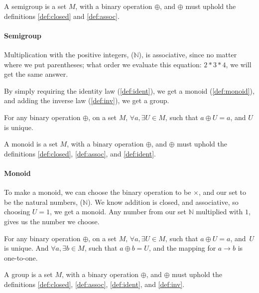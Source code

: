 \begin{definition}[Semigroup] \label{def:semi}
  A semigroup is a set $M$, with a binary operation $\oplus$, and $\oplus$ must
  uphold the definitions \ref{def:closed} and \ref{def:assoc}.
\end{definition}

\paragraph{Semigroup} Multiplication with the positive integers, ($\mathbb{N}$), is
  associative, since no matter where we put parentheses; what order we
  evaluate this equation: $2 * 3 * 4$, we will get the same answer.

By simply requiring the identity law (\ref{def:ident}), we get a
monoid (\ref{def:monoid}), and adding the inverse law
(\ref{def:inv}), we get a group.

\begin{definition} \label{def:ident}
  For any binary operation $\oplus$, on a set $M$,
  $\forall a, \exists U \in M$, such that
  $a \oplus U = a$, and $U$ is unique.
\end{definition}

\begin{definition}[Monoid] \label{def:monoid}
  A monoid is a set $M$, with a binary operation $\oplus$, and $\oplus$ must
  uphold the definitions \ref{def:closed}, \ref{def:assoc}, and \ref{def:ident}.
\end{definition}

\paragraph{Monoid} To make a monoid, we can choose the binary operation to be
  $\times$, and our set to be the natural numbers, ($\mathbb{N}$). We know addition
  is closed, and associative, so choosing $U = 1$, we get a monoid. Any number
  from our set $\mathbb{N}$ multiplied with $1$, gives us the number we choose.

\begin{definition} \label{def:inv}
  For any binary operation $\oplus$, on a set $M$,
  $\forall a, \exists U \in M$, such that
  $a \oplus U = a$, and $U$ is unique.
  And $\forall a, \exists b \in M$, such that $a \oplus b = U$, and the mapping
  for $a \to b$ is one-to-one.
\end{definition}

\begin{definition}[Group] \label{def:group}
  A group is a set $M$, with a binary operation $\oplus$, and $\oplus$ must
  uphold the definitions \ref{def:closed}, \ref{def:assoc}, \ref{def:ident},
  and \ref{def:inv}.
\end{definition}

